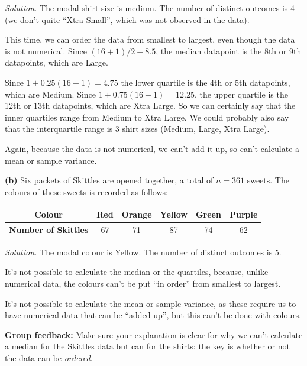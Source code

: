 \documentclass[
  a4paper,
]{book}
\theoremstyle{definition}
\theoremstyle{definition}
\theoremstyle{definition}
\theoremstyle{definition}
\theoremstyle{remark}
\begin{document}
\begin{myanswers}
\emph{Solution.}
The modal shirt size is medium. The number of distinct outcomes is 4 (we don't quite ``Xtra Small'', which was not observed in the data).

This time, we can order the data from smallest to largest, even though the data is not numerical. Since \((16 + 1)/2 - 8.5\), the median datapoint is the 8th or 9th datapoints, which are Large.

Since \(1 + 0.25(16 - 1) = 4.75\) the lower quartile is the 4th or 5th datapoints, which are Medium. Since \(1 + 0.75(16-1) = 12.25\), the upper quartile is the 12th or 13th datapoints, which are Xtra Large. So we can certainly say that the inner quartiles range from Medium to Xtra Large. We could probably also say that the interquartile range is 3 shirt sizes (Medium, Large, Xtra Large).

Again, because the data is not numerical, we can't add it up, so can't calculate a mean or sample variance.

\end{myanswers}

\textbf{(b)} Six packets of Skittles are opened together, a total of \(n = 361\) sweets. The colours of these sweets is recorded as follows:

\begin{longtable}[]{@{}cccccc@{}}
\toprule\noalign{}
\textbf{Colour} & Red & Orange & Yellow & Green & Purple \\
\midrule\noalign{}
\endhead
\bottomrule\noalign{}
\endlastfoot
\textbf{Number of Skittles} & 67 & 71 & 87 & 74 & 62 \\
\end{longtable}

\begin{myanswers}
\emph{Solution.}
The modal colour is Yellow. The number of distinct outcomes is 5.

It's not possible to calculate the median or the quartiles, because, unlike numerical data, the colours can't be put ``in order'' from smallest to largest.

It's not possible to calculate the mean or sample variance, as these require us to have numerical data that can be ``added up'', but this can't be done with colours.

\textbf{Group feedback:} Make sure your explanation is clear for why we can't calculate a median for the Skittles data but can for the shirts: the key is whether or not the data can be \emph{ordered}.

\end{myanswers}
\end{document}
